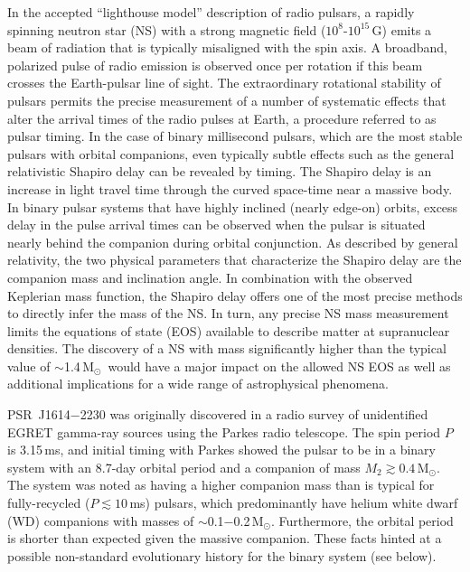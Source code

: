 \documentclass[12pt]{article}
\newcommand{\msun}{M$_\odot$}
\begin{document}
In the accepted ``lighthouse model'' description of radio pulsars, a
rapidly spinning neutron star (NS) with a strong magnetic field
($10^8$-$10^{15}$\,G) emits a beam of radiation that is typically
misaligned with the spin axis.  A broadband, polarized pulse of radio
emission is observed once per rotation if this beam crosses the
Earth-pulsar line of sight.  The extraordinary rotational stability of
pulsars permits the precise measurement of a number of systematic
effects that alter the arrival times of the radio pulses at Earth, a
procedure referred to as pulsar timing.  In the case of binary
millisecond pulsars, which are the most stable pulsars with orbital
companions, even typically subtle effects such as the general
relativistic Shapiro delay can be revealed by timing.  The Shapiro delay
is an increase in light travel time through the curved space-time near a
massive body.  In binary pulsar systems that have highly inclined
(nearly edge-on) orbits, excess delay in the pulse arrival times can be
observed when the pulsar is situated nearly behind the companion during
orbital conjunction.  As described by general relativity, the two
physical parameters that characterize the Shapiro delay are the
companion mass and inclination angle.  In combination with the observed
Keplerian mass function, the Shapiro delay offers one of the most
precise methods to directly infer the mass of the NS.  In turn, any
precise NS mass measurement limits the equations of state (EOS)
available to describe matter at supranuclear densities.  The discovery
of a NS with mass significantly higher than the typical value of
$\sim$1.4\,\msun~would have a major impact on the allowed NS EOS as well
as additional implications for a wide range of astrophysical
phenomena\cite{opr+10}.

PSR~J1614$-$2230 was originally discovered in a radio survey of
unidentified EGRET gamma-ray sources using the Parkes radio
telescope\cite{hrr+05}.  The spin period $P$ is 3.15\,ms, and initial
timing with Parkes showed the pulsar to be in a binary system with an
8.7-day orbital period and a companion of mass $M_2 \gtrsim
0.4$\,M$_\odot$.  The system was noted as having a higher companion mass
than is typical for fully-recycled ($P\lesssim10$\,ms) pulsars, which
predominantly have helium white dwarf (WD) companions with masses of
$\sim$0.1$-$0.2\,\msun.  Furthermore, the orbital period is shorter than
expected given the massive companion\cite{rpj+95}.  These facts hinted
at a possible non-standard evolutionary history for the binary system
(see below).  
\end{document}
